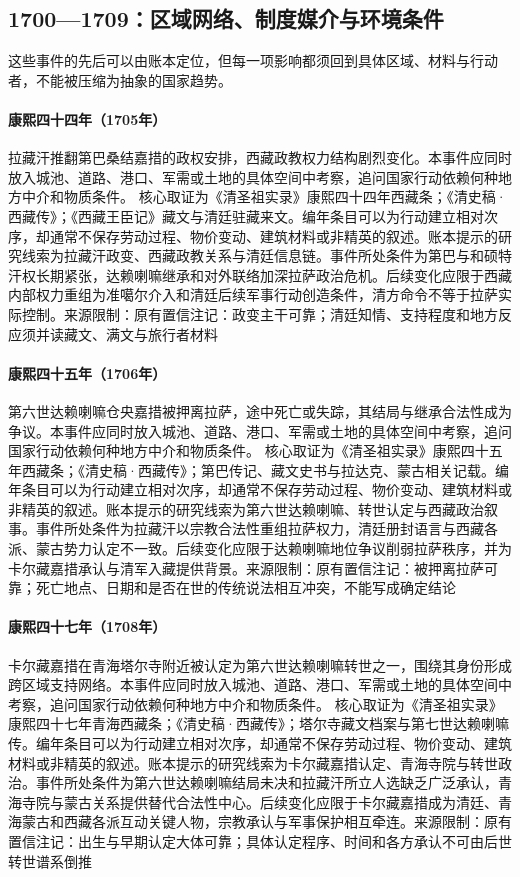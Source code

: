 \subsection{1700—1709：区域网络、制度媒介与环境条件}
这些事件的先后可以由账本定位，但每一项影响都须回到具体区域、材料与行动者，不能被压缩为抽象的国家趋势。
\hypertarget{civic:EQ-1705-LHAZANG-TAKEOVER}{}\paragraph{康熙四十四年（1705年）}拉藏汗推翻第巴桑结嘉措的政权安排，西藏政教权力结构剧烈变化。本事件应同时放入城池、道路、港口、军需或土地的具体空间中考察，追问国家行动依赖何种地方中介和物质条件。 核心取证为《清圣祖实录》康熙四十四年西藏条；《清史稿·西藏传》；《西藏王臣记》藏文与清廷驻藏来文。编年条目可以为行动建立相对次序，却通常不保存劳动过程、物价变动、建筑材料或非精英的叙述。账本提示的研究线索为拉藏汗政变、西藏政教关系与清廷信息链。事件所处条件为第巴与和硕特汗权长期紧张，达赖喇嘛继承和对外联络加深拉萨政治危机。后续变化应限于西藏内部权力重组为准噶尔介入和清廷后续军事行动创造条件，清方命令不等于拉萨实际控制。来源限制：原有置信注记：政变主干可靠；清廷知情、支持程度和地方反应须并读藏文、满文与旅行者材料
\hypertarget{civic:EQ-1706-SIXTH-DALAI}{}\paragraph{康熙四十五年（1706年）}第六世达赖喇嘛仓央嘉措被押离拉萨，途中死亡或失踪，其结局与继承合法性成为争议。本事件应同时放入城池、道路、港口、军需或土地的具体空间中考察，追问国家行动依赖何种地方中介和物质条件。 核心取证为《清圣祖实录》康熙四十五年西藏条；《清史稿·西藏传》；第巴传记、藏文史书与拉达克、蒙古相关记载。编年条目可以为行动建立相对次序，却通常不保存劳动过程、物价变动、建筑材料或非精英的叙述。账本提示的研究线索为第六世达赖喇嘛、转世认定与西藏政治叙事。事件所处条件为拉藏汗以宗教合法性重组拉萨权力，清廷册封语言与西藏各派、蒙古势力认定不一致。后续变化应限于达赖喇嘛地位争议削弱拉萨秩序，并为卡尔藏嘉措承认与清军入藏提供背景。来源限制：原有置信注记：被押离拉萨可靠；死亡地点、日期和是否在世的传统说法相互冲突，不能写成确定结论
\hypertarget{civic:EQ-1708-KELZANG}{}\paragraph{康熙四十七年（1708年）}卡尔藏嘉措在青海塔尔寺附近被认定为第六世达赖喇嘛转世之一，围绕其身份形成跨区域支持网络。本事件应同时放入城池、道路、港口、军需或土地的具体空间中考察，追问国家行动依赖何种地方中介和物质条件。 核心取证为《清圣祖实录》康熙四十七年青海西藏条；《清史稿·西藏传》；塔尔寺藏文档案与第七世达赖喇嘛传。编年条目可以为行动建立相对次序，却通常不保存劳动过程、物价变动、建筑材料或非精英的叙述。账本提示的研究线索为卡尔藏嘉措认定、青海寺院与转世政治。事件所处条件为第六世达赖喇嘛结局未决和拉藏汗所立人选缺乏广泛承认，青海寺院与蒙古关系提供替代合法性中心。后续变化应限于卡尔藏嘉措成为清廷、青海蒙古和西藏各派互动关键人物，宗教承认与军事保护相互牵连。来源限制：原有置信注记：出生与早期认定大体可靠；具体认定程序、时间和各方承认不可由后世转世谱系倒推
